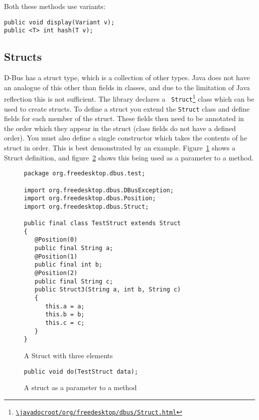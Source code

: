 \documentclass[a4paper,12pt]{article}
\begin{document}
Both these methods use variants:

\begin{verbatim}
public void display(Variant v);
public <T> int hash(T v);
\end{verbatim}

\subsection{Structs}

D-Bus has a struct type, which is a collection of other types. Java
does not have an analogue of this other than fields in classes, and
due to the limitation of Java reflection this is not sufficient. The
library declares a {\tt
Struct\footnote{\url{\javadocroot/org/freedesktop/dbus/Struct.html}}} class which can be used to create structs.
To define a struct you extend the {\tt Struct} class and define fields for each member of the struct.
These fields then need to be annotated in the order which they appear in the struct (class fields do not have a defined order). You must also define a single constructor which takes the contents of he struct in order. This is best demonstrated by an example.
Figure~\ref{fig:struct} shows a Struct definition, and
figure~\ref{fig:structmethod} shows this being used as a parameter
to a method.

\begin{figure}[htb]
\begin{center}
\begin{verbatim}
package org.freedesktop.dbus.test;

import org.freedesktop.dbus.DBusException;
import org.freedesktop.dbus.Position;
import org.freedesktop.dbus.Struct;

public final class TestStruct extends Struct
{
   @Position(0)
   public final String a;
   @Position(1)
   public final int b;
   @Position(2)
   public final String c;
   public Struct3(String a, int b, String c)
   {
      this.a = a;
      this.b = b;
      this.c = c;
   }
}
\end{verbatim}
\end{center}
\caption{A Struct with three elements}
\label{fig:struct}
\end{figure}

\begin{figure}[htb]
\begin{center}
\begin{verbatim}
public void do(TestStruct data);
\end{verbatim}
\end{center}
\caption{A struct as a parameter to a method}
\label{fig:structmethod}
\end{figure}
\end{document}
